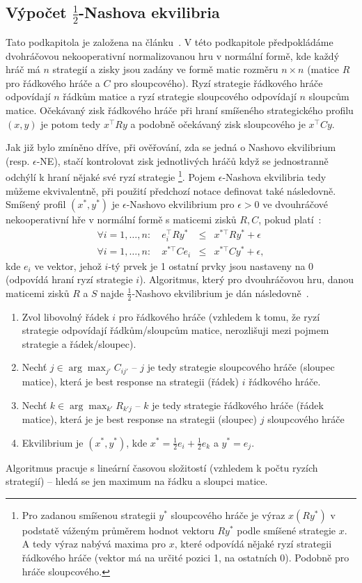 \documentclass[a4paper,12pt]{article}
\begin{document}
\subsection{Výpočet $\frac{1}{2}$-Nashova ekvilibria}
Tato podkapitola je založena na článku~\cite{DASKALAKIS20091581}.
V této podkapitole předpokládáme dvohráčovou nekooperativní normalizovanou hru v normální formě, kde každý hráč má $n$ strategií a zisky jsou zadány ve formě matic 
rozměru $n\times n$ (matice $R$ pro řádkového hráče a $C$ pro sloupcového). Ryzí strategie řádkového hráče odpovídají $n$ řádkům matice
a ryzí strategie sloupcového odpovídají $n$ sloupcům matice. Očekávaný zisk řádkového hráče při hraní smíšeného strategického profilu $(x,y)$
je potom tedy $x^\top Ry$ a podobně očekávaný zisk sloupcového je $x^\top Cy$.

Jak již bylo zmíněno dříve, při ověřování, zda se jedná o Nashovo ekvilibrium (resp. $\epsilon$-NE), stačí kontrolovat zisk jednotlivých hráčů když se 
jednostranně odchýlí k hraní nějaké své ryzí strategie
\footnote{Pro zadanou smíšenou strategii $y^*$ sloupcového hráče je výraz $x(Ry^*)$ v podstatě váženým průměrem hodnot vektoru $Ry^*$ podle smíšené 
strategie $x$. A tedy výraz nabývá maxima pro $x$, které odpovídá nějaké ryzí strategii řádkového hráče (vektor má na určité pozici 1, na ostatních 0). Podobně pro hráče sloupcového.}.
Pojem $\epsilon$-Nashova ekvilibria tedy můžeme ekvivalentně, při použití předchozí notace definovat také následovně. Smíšený profil $(x^*,y^*)$
je $\epsilon$-Nashovo ekvilibrium pro $\epsilon > 0$ ve dvouhráčové nekooperativní hře v normální formě s maticemi zisků $R,C$, pokud platí~\cite{DASKALAKIS20091581}:
\begin{eqnarray}
  \label{eq:eps1}\forall i = 1,\dots,n:\quad e_i^\top Ry^* &\leq& x^{*\top}Ry^* + \epsilon \\
  \label{eq:eps2}\forall i = 1,\dots,n:\quad x^{*\top} Ce_i &\leq& x^{*\top}Cy^* + \epsilon,
\end{eqnarray}
kde $e_i$ ve vektor, jehož $i$-tý prvek je 1 ostatní prvky jsou nastaveny na 0 (odpovídá hraní ryzí strategie $i$).
Algoritmus, který pro dvouhráčovou hru, danou maticemi zisků $R$ a $S$ najde $\frac{1}{2}$-Nashovo ekvilibrium je dán následovně~\cite{DASKALAKIS20091581}.
\begin{enumerate}
 \item Zvol libovolný řádek $i$ pro řádkového hráče (vzhledem k tomu, že ryzí strategie odpovídají řádkům/sloupcům matice, nerozlišuji mezi pojmem strategie a řádek/sloupec).
 \item Nechť $j \in \arg\max_{j'}C_{ij'}$ -- $j$ je tedy strategie sloupcového hráče (sloupec matice), která je best response na strategii (řádek) $i$ řádkového hráče.
 \item Nechť $k \in \arg\max_{k'}R_{k'j}$ -- $k$ je tedy strategie řádkového hráče (řádek matice), která je  je best response na strategii (sloupec) $j$ sloupcového hráče
 \item Ekvilibrium je $(x^*, y^*)$, kde $x^* = \frac{1}{2}e_i + \frac{1}{2}e_k$ a $y^* = e_j$.
\end{enumerate}
Algoritmus pracuje s lineární časovou složitostí (vzhledem k počtu ryzích strategií) -- hledá se jen maximum na řádku a sloupci matice.
\end{document}
